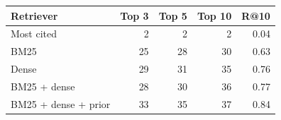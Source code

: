 \begin{tabular}{lrrrr}
\toprule
Retriever & Top 3 & Top 5 & Top 10 & R@10 \\
\midrule
Most cited & 2 & 2 & 2 & 0.04 \\
BM25 & 25 & 28 & 30 & 0.63 \\
Dense & 29 & 31 & 35 & 0.76 \\
BM25 + dense & 28 & 30 & 36 & 0.77 \\
BM25 + dense + prior & 33 & 35 & 37 & 0.84 \\
\bottomrule
\end{tabular}
